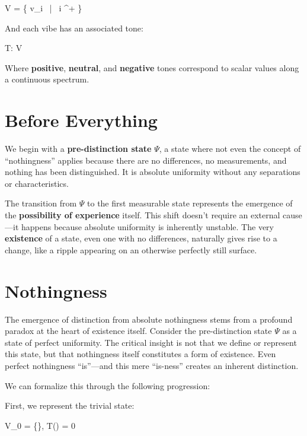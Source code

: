 \documentclass{article}
\let\oldequation\equation
\let\endoldequation\endequation
\renewenvironment{equation}{%
    \noindent\vspace{-\parskip}\vspace{-\baselineskip}%
    \oldequation
}{%
    \endoldequation
    \noindent\vspace{-\parskip}\vspace{-\baselineskip}%
}
\theoremstyle{definition}
\begin{document}
\begin{equation}
V = \{ v_i \ | \ i \in {}^+ \}
\end{equation}

And each vibe has an associated tone:

\begin{equation}
T: V \rightarrow {}
\end{equation}

Where \textbf{positive}, \textbf{neutral}, and \textbf{negative} tones correspond to scalar values along a continuous spectrum.

\section{Before Everything}

We begin with a \textbf{pre-distinction state} $\Psi$, a state where not even the concept of \enquote{nothingness} applies because there are no differences, no measurements, and nothing has been distinguished. It is absolute uniformity without any separations or characteristics.

The transition from $\Psi$ to the first measurable state represents the emergence of the \textbf{possibility of experience} itself. This shift doesn't require an external cause—it happens because absolute uniformity is inherently unstable. The very \textbf{existence} of a state, even one with no differences, naturally gives rise to a change, like a ripple appearing on an otherwise perfectly still surface.

\section{Nothingness}

The emergence of distinction from absolute nothingness stems from a profound paradox at the heart of existence itself. Consider the pre-distinction state $\Psi$ as a state of perfect uniformity. The critical insight is not that we define or represent this state, but that nothingness itself constitutes a form of existence. Even perfect nothingness ``is''---and this mere ``is-ness'' creates an inherent distinction.

We can formalize this through the following progression:

First, we represent the trivial state:
\begin{equation}
V_0 = \{\emptyset\}, \quad T(\emptyset) = 0
\end{equation}
\end{document}
